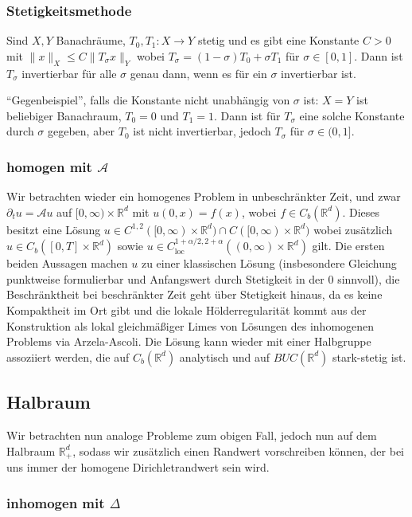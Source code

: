 \documentclass[11pt,a4paper]{scrartcl}
\newcommand{\R}{\mathbb{R}} %
\newcommand{\A}{\mathcal{A}}
\theoremstyle{plain}
\theoremstyle{definition}
\theoremstyle{remark}
\begin{document}
\subsubsection{Stetigkeitsmethode}

Sind $X,Y$ Banachräume, $T_0,T_1:X\to Y$ stetig und es gibt eine Konstante $C>0$ mit $\|x\|_X \leq C \|T_\sigma x\|_Y$ wobei $T_\sigma = (1-\sigma) T_0 + \sigma T_1$ für $\sigma\in [0,1]$. Dann ist $T_\sigma$ invertierbar für alle $\sigma$ genau dann, wenn es für ein $\sigma$ invertierbar ist.

\enquote{Gegenbeispiel}, falls die Konstante nicht unabhängig von $\sigma$ ist: $X=Y$ ist beliebiger Banachraum, $T_0=0$ und $T_1=1$. Dann ist für $T_\sigma$ eine solche Konstante durch $\sigma$ gegeben, aber $T_0$ ist nicht invertierbar, jedoch $T_\sigma$ für $\sigma\in (0,1]$.

\subsubsection{homogen mit $\A$}

Wir betrachten wieder ein homogenes Problem in unbeschränkter Zeit, und zwar $\partial_t u = \A u$ auf $[0,\infty)\times \R^d$ mit $u(0,x)=f(x)$, wobei $f\in C_b(\R^d)$. Dieses besitzt eine Lösung $u\in C^{1,2}([0,\infty)\times \R^d) \cap C([0,\infty)\times \R^d)$ wobei zusätzlich $u\in C_b([0,T]\times \R^d)$ sowie $u\in C_\mathrm{loc}^{1+\alpha/2,2+\alpha}((0,\infty)\times \R^d)$ gilt. Die ersten beiden Aussagen machen $u$ zu einer klassischen Lösung (insbesondere Gleichung punktweise formulierbar und Anfangswert durch Stetigkeit in der $0$ sinnvoll), die Beschränktheit bei beschränkter Zeit geht über Stetigkeit hinaus, da es keine Kompaktheit im Ort gibt und die lokale Hölderregularität kommt aus der Konstruktion als lokal gleichmäßiger Limes von Lösungen des inhomogenen Problems via Arzela-Ascoli. Die Lösung kann wieder mit einer Halbgruppe assoziiert werden, die auf $C_b(\R^d)$ analytisch und auf $BUC(\R^d)$ stark-stetig ist.

\subsection{Halbraum}

Wir betrachten nun analoge Probleme zum obigen Fall, jedoch nun auf dem Halbraum $\R^d_+$, sodass wir zusätzlich einen Randwert vorschreiben können, der bei uns immer der homogene Dirichletrandwert sein wird.

\subsubsection{inhomogen mit $\Delta$}
\end{document}
